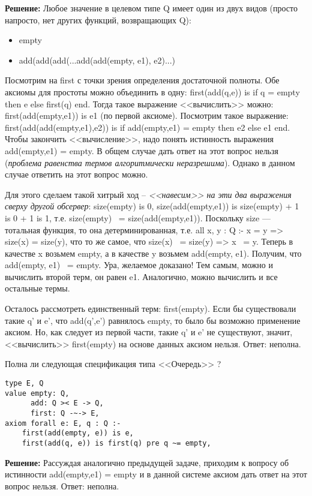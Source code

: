 \textbf{Решение:}
Любое значение в целевом типе Q имеет один из двух видов (просто напросто, нет других функций, возвращающих Q):
\begin{itemize}
  \item empty
  \item add(add(add(...add(add(empty, e1), e2)...)
\end{itemize}

Посмотрим на first с точки зрения определения достаточной полноты. Обе аксиомы для простоты можно объединить в одну: first(add(q,e)) is if q = empty then e else first(q) end. Тогда такое выражение <<вычислить>> можно: first(add(empty,e1)) is e1 (по первой аксиоме). Посмотрим такое выражение: first(add(add(empty,e1),e2)) is if add(empty,e1) = empty then e2 else e1 end. Чтобы закончить <<вычисление>>, надо понять истинность выражения add(empty,e1) = empty. В общем случае дать ответ на этот вопрос нельзя (\emph{проблема равенства термов алгоритмически неразрешима}). Однако в данном случае ответить на этот вопрос можно.

Для этого сделаем такой хитрый ход -- \emph{<<навесим>> на эти два выражения сверху другой обсервер}: size(empty) is 0, size(add(empty,e1)) is size(empty) + 1 is 0 + 1 is 1, т.е. size(empty) ~= size(add(empty,e1)). Поскольку size --- тотальная функция, то она детерминированная, т.е. all x, y : Q :- x = y => size(x) = size(y), что то же самое, что size(x) ~= size(y) => x ~= y. Теперь в качестве x возьмем empty, а в качестве y возьмем add(empty, e1). Получим, что add(empty, e1) ~= empty. Ура, желаемое доказано! Тем самым, можно и вычислить второй терм, он равен e1. Аналогично, можно вычислить и все остальные термы.

Осталось рассмотреть единственный терм: first(empty). Если бы существовали такие q' и e', что add(q',e') равнялось empty, то было бы возможно применение аксиом. Но, как следует из первой части, такие q' и e' не существуют, значит, <<вычислить>> first(empty) на основе данных аксиом нельзя. Ответ: неполна.

\z Полна ли следующая спецификация типа <<Очередь>> ?
\begin{lstlisting}
type E, Q
value empty: Q,
      add: Q >< E -> Q,
      first: Q -~-> E,
axiom forall e: E, q : Q :-
    first(add(empty, e)) is e,
    first(add(q, e)) is first(q) pre q ~= empty,
\end{lstlisting}

\textbf{Решение:}
Рассуждая аналогично предыдущей задаче, приходим к вопросу об истинности add(empty,e1) = empty и в данной системе аксиом дать ответ на этот вопрос нельзя. Ответ: неполна.


